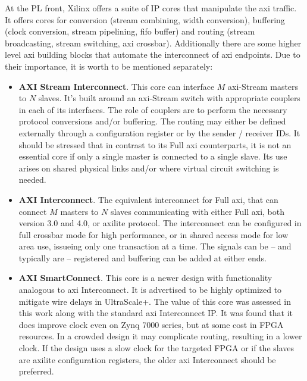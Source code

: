 At the PL front, Xilinx offers a suite of 
IP cores that manipulate the \gls{axi} traffic.
It offers cores for conversion (stream combining, 
width conversion), buffering (clock conversion,
stream pipelining, \gls{fifo} buffer) and routing 
(stream broadcasting, stream switching, \gls{axi} crossbar).
Additionally there are some higher level \gls{axi} building blocks
that automate the interconnect of \gls{axi} endpoints. 
Due to their importance, it is worth to be mentioned separately:

\begin{itemize}
\item	\textbf{AXI Stream Interconnect}. 
	This core can interface $M$ \gls{axi}-Stream masters to $N$ slaves.
	It's built around an \gls{axi}-Stream switch with appropriate
	couplers in each of its interfaces.
	The role of couplers are to perform the necessary protocol conversions and/or buffering.
	The routing may either be defined externally through 
	a configuration register or by 	the sender / receiver IDs. 
	It should be stressed that in contrast to its Full \gls{axi} counterparts, 
	it is not an essential core if only a single master is connected to a single slave.
	Its use arises on shared physical links and/or where virtual circuit switching is needed.
\item	\textbf{AXI Interconnect}. 
	The equivalent interconnect for Full \gls{axi}, that can connect $M$ masters
	to $N$ slaves communicating with either Full \gls{axi},
	both version 3.0 and 4.0, or \gls{axilite} protocol.
	The interconnect can be configured in full crossbar mode for high performance,
	or in shared access mode for low area use, issueing only one transaction at a time.
	The signals can be -- and typically are -- registered 
	and buffering can be added at either ends.
\item	\textbf{AXI SmartConnect}. 
	This core is a newer design with functionality analogous to \gls{axi} Interconnect.
	It is advertised to be highly optimized to mitigate wire delays in UltraScale+.
	The value of this core was assessed in this work along with
	the standard \gls{axi} Interconnect IP.
	It was found that it does improve clock even on Zynq 7000 series,
	but at some cost in FPGA resources. 
	In a crowded design it may complicate routing, resulting in a lower clock.
	If the design uses a slow clock for the targeted FPGA or 
	if the slaves are \gls{axilite} configuration registers,
	the older \gls{axi} Interconnect should be preferred.
\end{itemize}

